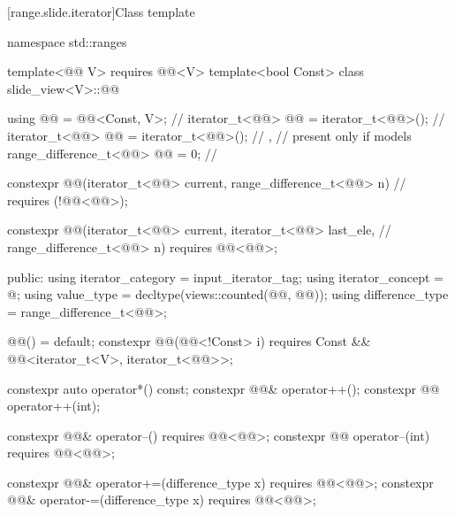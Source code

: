 [range.slide.iterator]{Class template }

\begin{codeblock}
namespace std::ranges {
  template<@@ V>
    requires @@<V>
  template<bool Const>
  class slide_view<V>::@@ {
    using @@ = @@<Const, V>;                 // \expos
    iterator_t<@@> @@   = iterator_t<@@>();   // \expos
    iterator_t<@@> @@  = iterator_t<@@>();   // \expos,
                                               // present only if  models 
    range_difference_t<@@> @@ = 0;                    // \expos

    constexpr @@(iterator_t<@@> current, range_difference_t<@@> n) // \expos
      requires (!@@<@@>);

    constexpr @@(iterator_t<@@> current, iterator_t<@@> last_ele,  // \expos
                       range_difference_t<@@> n)
      requires @@<@@>;

  public:
    using iterator_category = input_iterator_tag;
    using iterator_concept = @\seebelow@;
    using value_type = decltype(views::counted(@@, @@));
    using difference_type = range_difference_t<@@>;

    @@() = default;
    constexpr @@(@@<!Const> i)
      requires Const && @@<iterator_t<V>, iterator_t<@@>>;

    constexpr auto operator*() const;
    constexpr @@& operator++();
    constexpr @@ operator++(int);

    constexpr @@& operator--() requires @@<@@>;
    constexpr @@ operator--(int) requires @@<@@>;

    constexpr @@& operator+=(difference_type x)
      requires @@<@@>;
    constexpr @@& operator-=(difference_type x)
      requires @@<@@>;

}}
\end{codeblock}
